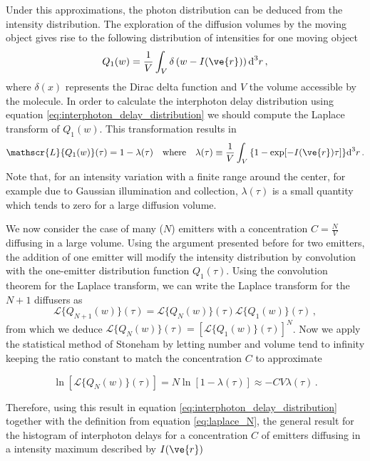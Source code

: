 Under this approximations, the photon distribution can be deduced from the intensity distribution. The exploration of the diffusion volumes by the moving object gives rise to the following distribution of intensities for one moving object
\begin{equation}
Q_1(w)=\frac{1}{V}\int_V{\delta\left( w-I(\ve{r})\right)\mbox{d}^3r} \,,
\label{eq:intesity1}
\end{equation} 
where $\delta(x)$ represents the Dirac delta function and $V$ the volume accessible by the molecule.
In order to calculate the interphoton delay distribution using equation \ref{eq:interphoton_delay_distribution} we should compute the Laplace transform of $Q_1(w)$. This transformation results in 
\begin{equation}
\mathscr{L}\{Q_1(w)\}(\tau) = 1 -\lambda(\tau) \quad \mbox{where} \quad 
\lambda(\tau)\equiv \frac{1}{V}\int_V{ \{1-\exp[-I(\ve{r})\tau]\}\mbox{d}^3r} \, .
\label{eq:one-emitter}
\end{equation} 
Note that, for an intensity variation with a finite range around the center, for example due to Gaussian illumination and collection, $\lambda(\tau)$ is a small quantity which tends to zero for a large diffusion volume.  

We now consider the case of many ($N$) emitters with a concentration $C=\frac{N}{V}$ diffusing in a large volume. Using the argument presented before for two emitters, the addition of one emitter will modify the intensity distribution by convolution with the one-emitter distribution function $Q_1(\tau)$.
Using the convolution theorem for the Laplace transform, we can write the Laplace transform for the $N+1$ 
diffusers as
\begin{equation}
\mathscr{L}\{Q_{N+1}(w)\}(\tau) = \mathscr{L}\{Q_N(w)\}(\tau) \mathscr{L}\{Q_1(w)\}(\tau)\,,
\label{eq:laplace_N}
\end{equation}
from which we deduce $\mathscr{L}\{Q_{N}(w)\}(\tau)=\left[\mathscr{L}\{Q_{1}(w)\}(\tau)\right]^N $. Now we apply the statistical method of Stoneham \cite{STONEHAM1969, Fleury1995} by letting number and volume tend to infinity keeping the ratio constant to match the concentration $C$ to approximate

\begin{equation}
\ln\left[\mathscr{L}\{Q_{N}(w)\}(\tau)\right] = 
N\ln\left[1-\lambda(\tau)\right] \approx - C V \lambda(\tau)\,.
\label{eq:stoneham_approx}
\end{equation}

Therefore, using this result in equation \ref{eq:interphoton_delay_distribution} 
together with the definition from equation \ref{eq:laplace_N}, the general result for the histogram of interphoton delays for a concentration $C$ of emitters diffusing in a intensity maximum described by $I(\ve{r})$ 

